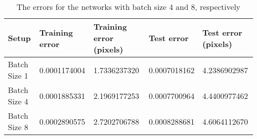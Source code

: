 \begin{table}[h!]
\centering
\footnotesize
\begin{tabular}{|l|l|l|l|l|}
	\hline
		\textbf{Setup} & \textbf{Training error} & \textbf{Training error (pixels)} & \textbf{Test error} & \textbf{Test error (pixels)}\\
	\hline
		Batch Size 1	& 0.0001174004%
						& 1.7336237320%
						& 0.0007018162%
						& 4.2386902987%
						\\
	\hline
		Batch Size 4 	& 0.0001885331%
						& 2.1969177253%
						& 0.0007700964%
						& 4.4400977462%
						\\
	\hline
		Batch Size 8	& 0.0002890575%
						& 2.7202706788%
						& 0.0008288681%
						& 4.6064112670%
						\\
	\hline
	\end{tabular}
	\normalsize
	\caption{The errors for the networks with batch size 4 and 8, respectively}
	\label{tab:cnn_errors_batchsize8}
\end{table}
